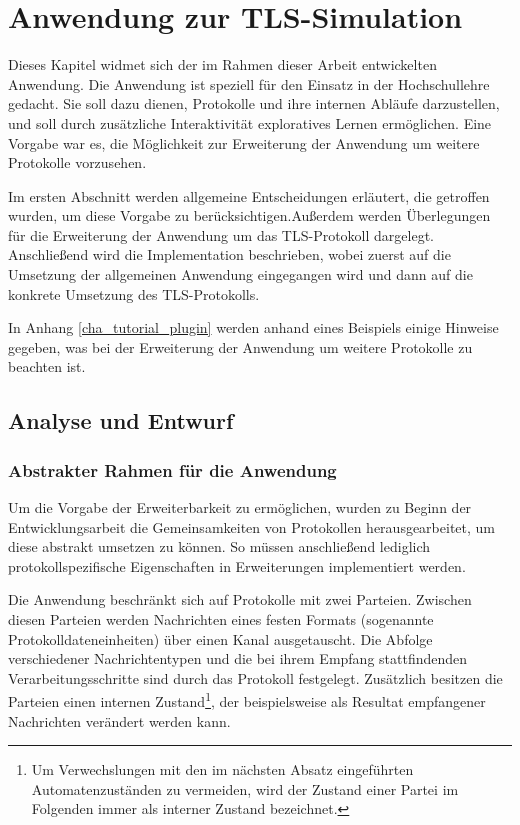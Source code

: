 \chapter{Anwendung zur TLS-Simulation}
\label{cha_implementation}

Dieses Kapitel widmet sich der im Rahmen dieser Arbeit entwickelten Anwendung. 
Die Anwendung ist speziell für den Einsatz in der Hochschullehre gedacht. Sie soll dazu dienen, Protokolle und ihre internen Abläufe darzustellen, und soll durch zusätzliche Interaktivität exploratives Lernen ermöglichen. Eine Vorgabe war es, die Möglichkeit zur Erweiterung der Anwendung um weitere Protokolle vorzusehen. 

Im ersten Abschnitt werden allgemeine Entscheidungen erläutert, die getroffen wurden, um diese Vorgabe zu berücksichtigen.Außerdem werden Überlegungen für die Erweiterung der Anwendung um das TLS-Protokoll dargelegt.\\
Anschließend wird die Implementation beschrieben, wobei zuerst auf die Umsetzung der allgemeinen Anwendung eingegangen wird und dann auf die konkrete Umsetzung des TLS-Protokolls.

In Anhang \ref{cha_tutorial_plugin} werden anhand eines Beispiels einige Hinweise gegeben, was bei der Erweiterung der Anwendung um weitere Protokolle zu beachten ist.

\section{Analyse und Entwurf}

\subsection{Abstrakter Rahmen für die Anwendung}

Um die Vorgabe der Erweiterbarkeit zu ermöglichen, wurden zu Beginn der Entwicklungsarbeit die Gemeinsamkeiten von Protokollen herausgearbeitet, um diese abstrakt umsetzen zu können. So müssen anschließend lediglich protokollspezifische Eigenschaften in Erweiterungen implementiert werden.

Die Anwendung beschränkt sich auf Protokolle mit zwei Parteien. Zwischen diesen Parteien werden Nachrichten eines festen Formats (sogenannte Protokolldateneinheiten) über einen Kanal ausgetauscht. Die Abfolge verschiedener Nachrichtentypen und die bei ihrem Empfang stattfindenden Verarbeitungsschritte sind durch das Protokoll festgelegt. Zusätzlich besitzen die Parteien einen internen Zustand\footnote{
	Um Verwechslungen mit den im nächsten Absatz eingeführten Automatenzuständen zu vermeiden, wird der Zustand einer Partei im Folgenden immer als interner Zustand bezeichnet.
}, der beispielsweise als Resultat empfangener Nachrichten verändert werden kann. 

